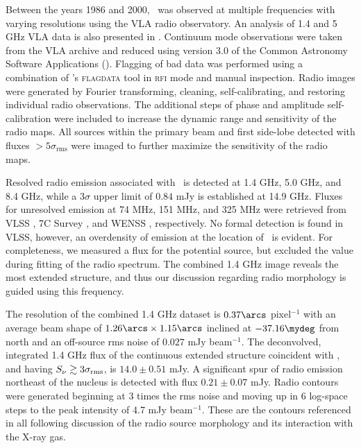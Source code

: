 \documentclass[useAMS,usenatbib]{mn2e}
\begin{document}
Between the years 1986 and 2000, \irs\ was observed at multiple
frequencies with varying resolutions using the VLA radio
observatory. An analysis of 1.4 and 5 GHz VLA data is also presented
in \citet[][hereafter H93]{1993ApJ...415...82H}. Continuum mode
observations were taken from the VLA archive and reduced using version
3.0 of the Common Astronomy Software Applications (\casa). Flagging of
bad data was performed using a combination of \casa's
{\textsc{flagdata}} tool in {\textsc{rfi}} mode and manual
inspection. Radio images were generated by Fourier transforming,
cleaning, self-calibrating, and restoring individual radio
observations. The additional steps of phase and amplitude
self-calibration were included to increase the dynamic range and
sensitivity of the radio maps. All sources within the primary beam and
first side-lobe detected with fluxes $> 5\sigma_{\mathrm{rms}}$ were
imaged to further maximize the sensitivity of the radio maps.

Resolved radio emission associated with \irs\ is detected at 1.4 GHz,
5.0 GHz, and 8.4 GHz, while a $3\sigma$ upper limit of $0.84$ mJy is
established at 14.9 GHz. Fluxes for unresolved emission at 74 MHz, 151
MHz, and 325 MHz were retrieved from VLSS \citep{vlss}, 7C Survey
\citep{1999MNRAS.306...31R}, and WENSS \citep{1997A&AS..124..259R},
respectively. No formal detection is found in VLSS, however, an
overdensity of emission at the location of \irs\ is evident. For
completeness, we measured a flux for the potential source, but
excluded the value during fitting of the radio spectrum. The combined
1.4 GHz image reveals the most extended structure, and thus our
discussion regarding radio morphology is guided using this frequency.

The resolution of the combined 1.4 GHz dataset is $0.37\arcs$
pixel$^{-1}$ with an average beam shape of $1.26\arcs \times
1.15\arcs$ inclined at $-37.16\mydeg$ from north and an off-source rms
noise of $0.027$ mJy beam$^{-1}$. The deconvolved, integrated 1.4 GHz
flux of the continuous extended structure coincident with \irs, and
having $S_{\nu} \gtrsim 3\sigma_{\mathrm{rms}}$, is $14.0 \pm 0.51$ mJy. A
significant spur of radio emission northeast of the nucleus is
detected with flux $0.21 \pm 0.07$ mJy. Radio contours were generated
beginning at 3 times the rms noise and moving up in 6 log-space steps
to the peak intensity of 4.7 mJy beam$^{-1}$. These are the contours
referenced in all following discussion of the radio source morphology
and its interaction with the X-ray gas.
\end{document}
